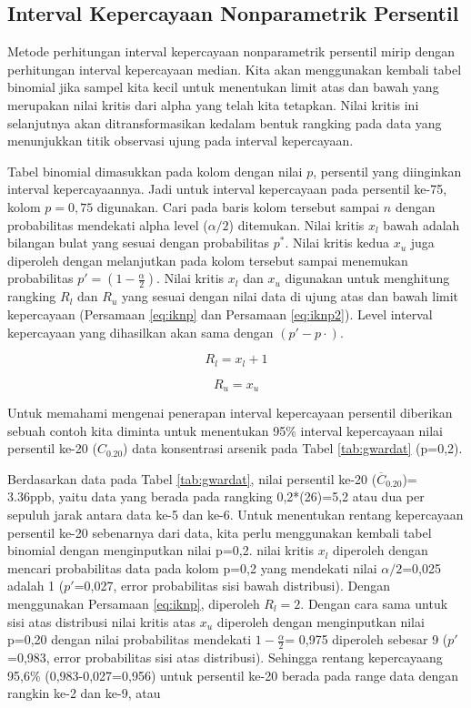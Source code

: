 \documentclass[]{book}
\begin{document}
\subsection{Interval Kepercayaan Nonparametrik
Persentil}\label{interval-kepercayaan-nonparametrik-persentil}

Metode perhitungan interval kepercayaan nonparametrik persentil mirip
dengan perhitungan interval kepercayaan median. Kita akan menggunakan
kembali tabel binomial jika sampel kita kecil untuk menentukan limit
atas dan bawah yang merupakan nilai kritis dari alpha yang telah kita
tetapkan. Nilai kritis ini selanjutnya akan ditransformasikan kedalam
bentuk rangking pada data yang menunjukkan titik observasi ujung pada
interval kepercayaan.

Tabel binomial dimasukkan pada kolom dengan nilai \(p\), persentil yang
diinginkan interval kepercayaannya. Jadi untuk interval kepercayaan pada
persentil ke-75, kolom \(p=0,75\) digunakan. Cari pada baris kolom
tersebut sampai \(n\) dengan probabilitas mendekati alpha level
(\(\alpha/2\)) ditemukan. Nilai kritis \(x_l\) bawah adalah bilangan
bulat yang sesuai dengan probabilitas \(p^*\). Nilai kritis kedua
\(x_u\) juga diperoleh dengan melanjutkan pada kolom tersebut sampai
menemukan probabilitas \(p'=\left(1-\frac{\alpha}{2}\right)\). Nilai
kritis \(x_l\) dan \(x_u\) digunakan untuk menghitung rangking \(R_l\)
dan \(R_u\) yang sesuai dengan nilai data di ujung atas dan bawah limit
kepercayaan (Persamaan \eqref{eq:iknp} dan Persamaan \eqref{eq:iknp2}).
Level interval kepercayaan yang dihasilkan akan sama dengan
\(\left(p'-p\cdot\right)\).

\begin{equation}
  R_l=x_l+1
  \label{eq:iknp}
\end{equation}

\begin{equation}
  R_u=x_u
  \label{eq:iknp2}
\end{equation}

Untuk memahami mengenai penerapan interval kepercayaan persentil
diberikan sebuah contoh kita diminta untuk menentukan 95\% interval
kepercayaan nilai persentil ke-20 (\(C_{0.20}\)) data konsentrasi
arsenik pada Tabel \ref{tab:gwardat} (p=0,2).

Berdasarkan data pada Tabel \ref{tab:gwardat}, nilai persentil ke-20
(\(\overline{C}_{0.20}\))= 3.36ppb, yaitu data yang berada pada rangking
0,2*(26)=5,2 atau dua per sepuluh jarak antara data ke-5 dan ke-6. Untuk
menentukan rentang kepercayaan persentil ke-20 sebenarnya dari data,
kita perlu menggunakan kembali tabel binomial dengan menginputkan nilai
p=0,2. nilai kritis \(x_l\) diperoleh dengan mencari probabilitas data
pada kolom p=0,2 yang mendekati nilai \(\alpha/2\)=0,025 adalah 1
(\(p'\)=0,027, error probabilitas sisi bawah distribusi). Dengan
menggunakan Persamaan \eqref{eq:iknp}, diperoleh \(R_l=2\). Dengan cara
sama untuk sisi atas distribusi nilai kritis atas \(x_u\) diperoleh
dengan menginputkan nilai p=0,20 dengan nilai probabilitas mendekati
\(1-\frac{\alpha}{2}\)= 0,975 diperoleh sebesar 9 (\(p'\)=0,983, error
probabilitas sisi atas distribusi). Sehingga rentang kepercayaang 95,6\%
(0,983-0,027=0,956) untuk persentil ke-20 berada pada range data dengan
rangkin ke-2 dan ke-9, atau
\end{document}
